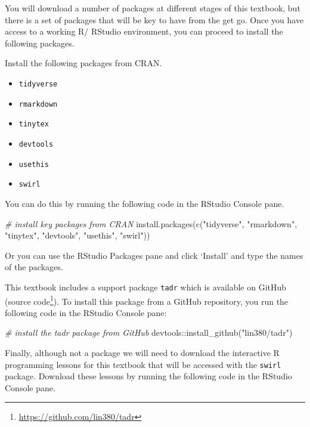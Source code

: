 \documentclass[
  letterpaper,
]{scrbook}
\newenvironment{Shaded}{\begin{snugshade}}{\end{snugshade}}
\newcommand{\CommentTok}[1]{\textcolor[rgb]{0.00,0.00,0.00}{\textit{#1}}}
\newcommand{\FunctionTok}[1]{\textcolor[rgb]{0.00,0.00,0.00}{#1}}
\newcommand{\NormalTok}[1]{\textcolor[rgb]{0.00,0.00,0.00}{#1}}
\newcommand{\SpecialCharTok}[1]{\textcolor[rgb]{0.00,0.00,0.00}{#1}}
\newcommand{\StringTok}[1]{\textcolor[rgb]{0.00,0.00,0.00}{#1}}
\providecommand{\tightlist}{%
  \setlength{\itemsep}{0pt}\setlength{\parskip}{0pt}}\usepackage{longtable,booktabs,array}
\DeclareRobustCommand{\href}[2]{#2\footnote{\url{#1}}}
\begin{document}
You will download a number of packages at different stages of this
textbook, but there is a set of packages that will be key to have from
the get go. Once you have access to a working R/ RStudio environment,
you can proceed to install the following packages.

Install the following packages from CRAN.

\begin{itemize}
\tightlist
\item
  \texttt{tidyverse}
\item
  \texttt{rmarkdown}
\item
  \texttt{tinytex}
\item
  \texttt{devtools}
\item
  \texttt{usethis}
\item
  \texttt{swirl}
\end{itemize}

You can do this by running the following code in the RStudio Console
pane.

\begin{Shaded}
\begin{Highlighting}[]
 \CommentTok{\# install key packages from CRAN}
\FunctionTok{install.packages}\NormalTok{(}\FunctionTok{c}\NormalTok{(}\StringTok{"tidyverse"}\NormalTok{, }\StringTok{"rmarkdown"}\NormalTok{, }\StringTok{"tinytex"}\NormalTok{, }\StringTok{"devtools"}\NormalTok{, }\StringTok{"usethis"}\NormalTok{, }\StringTok{"swirl"}\NormalTok{))}
\end{Highlighting}
\end{Shaded}

Or you can use the RStudio Packages pane and click `Install' and type
the names of the packages.

This textbook includes a support package \texttt{tadr} which is
available on GitHub (\href{https://github.com/lin380/tadr}{source
code}). To install this package from a GitHub repository, you run the
following code in the RStudio Console pane:

\begin{Shaded}
\begin{Highlighting}[]
\CommentTok{\# install the tadr package from GitHub}
\NormalTok{devtools}\SpecialCharTok{::}\FunctionTok{install\_github}\NormalTok{(}\StringTok{"lin380/tadr"}\NormalTok{) }
\end{Highlighting}
\end{Shaded}

Finally, although not a package we will need to download the interactive
R programming lessons for this textbook that will be accessed with the
\texttt{swirl} package. Download these lessons by running the following
code in the RStudio Console pane.
\end{document}
